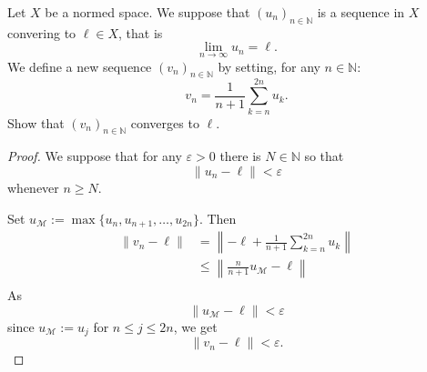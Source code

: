 \begin{prob}
    Let $X$ be a normed space. We suppose that $(u_n)_{n\in\mathbb N}$
    is a sequence in $X$ convering to $\ell \in X$, that is 
    \[
        \lim_{n\to\infty} u_n = \ell.
    \]
    We define a new sequence $(v_n)_{n\in\mathbb N}$ by setting, 
    for any $n \in \mathbb N$: 
    \[
        v_n = \frac{1}{n+1}\sum_{k=n}^{2n} u_k.
    \]
    Show that $(v_n)_{n\in\mathbb N}$ converges to $\ell$.
\end{prob}

\begin{proof}
    We suppose that for any $\varepsilon > 0$ there is 
    $N \in \mathbb N$ so that 
    \[
        \|u_n - \ell\| < \varepsilon
    \]
    whenever $n \geq N$.

    Set $u_{\mathcal M} := \max\{u_n, u_{n+1}, \ldots, u_{2n}\}$. 
    Then 
    \begin{align*}
        \|v_n - \ell\| 
        &= \left\| -\ell + \frac{1}{n+1}\sum_{k=n}^{2n} u_k 
        \right\| \\ 
        &\leq \left\|\frac{n}{n+1} u_{\mathcal M} - \ell\right\| \\ 
    \end{align*}
    As 
    \[
        \|u_{\mathcal M} - \ell\| < \varepsilon
    \]
    since $u_{\mathcal M} := u_j$ for $n \leq j \leq 2n$, we 
    get 
    \[
        \|v_n - \ell\| < \varepsilon.
    \]
\end{proof}

